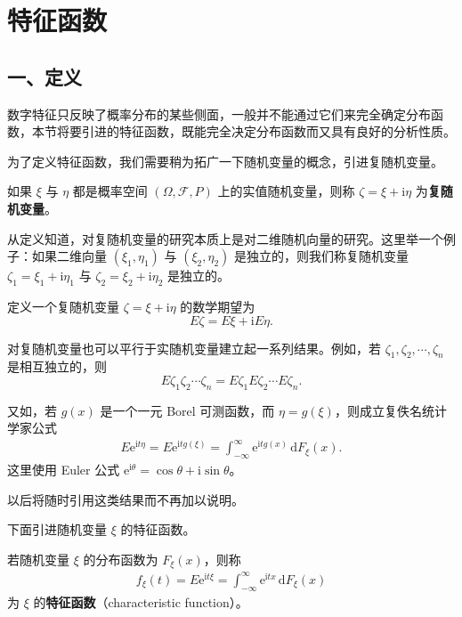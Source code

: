 \documentclass[../../main.tex]{subfiles}
\begin{document}
\section{特征函数}\label{section:ch04-特征函数}

\subsection*{一、定义}

数字特征只反映了概率分布的某些侧面，一般并不能通过它们来完全确定分布函数，本节将要引进的特征函数，既能完全决定分布函数而又具有良好的分析性质。

为了定义特征函数，我们需要稍为拓广一下随机变量的概念，引进复随机变量。

\begin{definition}[复随机变量]\label{definition:ch04-复随机变量}
如果 $\xi$ 与 $\eta$ 都是概率空间 $(\Omega,\mathscr{F},P)$ 上的实值随机变量，则称 $\zeta=\xi+\mathrm{i}\eta$ 为\textbf{复随机变量}。
\end{definition}

从定义知道，对复随机变量的研究本质上是对二维随机向量的研究。这里举一个例子：如果二维向量 $(\xi_1,\eta_1)$ 与 $(\xi_2,\eta_2)$ 是独立的，则我们称复随机变量 $\zeta_1=\xi_1+\mathrm{i}\eta_1$ 与 $\zeta_2=\xi_2+\mathrm{i}\eta_2$ 是独立的。

定义一个复随机变量 $\zeta=\xi+\mathrm{i}\eta$ 的数学期望为
\[
E\zeta=E\xi+\mathrm{i}E\eta.
\]

对复随机变量也可以平行于实随机变量建立起一系列结果。例如，若 $\zeta_1,\zeta_2,\cdots,\zeta_n$ 是相互独立的，则
\[
E\zeta_1\zeta_2\cdots\zeta_n=E\zeta_1 E\zeta_2\cdots E\zeta_n.
\]

又如，若 $g(x)$ 是一个一元 Borel 可测函数，而 $\eta=g(\xi)$，则成立复佚名统计学家公式
\begin{align}
E\mathrm{e}^{\mathrm{i}t\eta}=E\mathrm{e}^{\mathrm{i}tg(\xi)}=\int_{-\infty}^{\infty}\mathrm{e}^{\mathrm{i}tg(x)}\,\mathrm{d}F_\xi(x).\label{align:ch04-复佚名公式}
\end{align}
这里使用 Euler 公式 $\mathrm{e}^{\mathrm{i}\theta}=\cos\theta+\mathrm{i}\sin\theta$。

以后将随时引用这类结果而不再加以说明。

下面引进随机变量 $\xi$ 的特征函数。

\begin{definition}[特征函数]\label{definition:ch04-特征函数}
若随机变量 $\xi$ 的分布函数为 $F_\xi(x)$，则称
\begin{align}
f_\xi(t)=E\mathrm{e}^{\mathrm{i}t\xi}=\int_{-\infty}^{\infty}\mathrm{e}^{\mathrm{i}tx}\,\mathrm{d}F_\xi(x)\label{align:ch04-特征函数定义}
\end{align}
为 $\xi$ 的\textbf{特征函数}（characteristic function）。
\end{definition}
\end{document}
